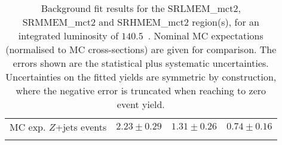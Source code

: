 \begin{table}
\begin{center}
{\begin{tabular*}{\textwidth}{@{\extracolsep{\fill}}lrrr}
        MC exp. $Z$+jets events         & $2.23 \pm 0.29$          & $1.31 \pm 0.26$          & $0.74 \pm 0.16$              \\
\noalign{\smallskip}\hline\noalign{\smallskip}
\end{tabular*}
}
\end{center}
\caption{ Background fit results for the SRLMEM\_mct2, SRMMEM\_mct2 and SRHMEM\_mct2 region(s),  for an integrated luminosity of $140.5$~\ifb.
Nominal MC expectations (normalised to MC cross-sections) are given for comparison. 
The errors shown are the statistical plus systematic uncertainties.
Uncertainties on the fitted yields are symmetric by construction, 
where the negative error is truncated when reaching to zero event yield.
}
\label{table.results.yields.fit.SR}
\end{table}
%